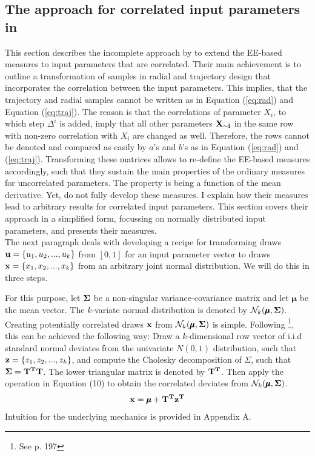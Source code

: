 \documentclass[a4paper,12pt]{article}
\begin{document}
\subsection{The approach for correlated input parameters in \cite{ge2017extending}}

This section describes the incomplete approach by \cite{ge2017extending} to extend the EE-based measures to input parameters that are correlated. Their main achievement is to outline a transformation of samples in radial and trajectory design that incorporates the correlation between the input parameters. This implies, that the trajectory and radial samples cannot be written as in Equation (\ref{eq:rad}) and Equation (\ref{eq:traj}). The reason is that the correlations of parameter $X_i$, to which step $\Delta^i$ is added, imply that all other parameters $\bold{X_{\sim i}}$ in the same row with non-zero correlation with $X_i$ are changed as well. Therefore, the rows cannot be denoted and compared as easily by $a$'s and $b$'s as in Equation (\ref{eq:rad}) and (\ref{eq:traj}). Transforming these matrices allows to re-define the EE-based measures accordingly, such that they sustain the main properties of the ordinary measures for uncorrelated parameters. The property is being a function of the mean derivative. Yet, \cite{ge2017extending} do not fully develop these measures. I explain how their measures lead to arbitrary results for correlated input parameters. This section covers their approach in a simplified form, focussing on normally distributed input parameters, and presents their measures.\\

\noindent
The next paragraph deals with developing a recipe for transforming draws $\bold{u} = \{u_1, u_2, ..., u_k\}$ from $[0,1]$ for an input parameter vector to draws $\bold{x} = \{x_1, x_2, ..., x_k\}$ from an arbitrary joint normal distribution. We will do this in three steps. 

For this purpose, let $\bold{\Sigma}$ be a non-singular variance-covariance matrix and let $\pmb{\mu}$ be the mean vector. The $k$-variate normal distribution is denoted by $\mathcal{N}_k(\pmb{\mu}, \bold{\Sigma})$. \\

\noindent
Creating potentially correlated draws $\bold{x}$ from $\mathcal{N}_k(\pmb{\mu}, \bold{\Sigma})$ is simple. Following \cite{gentle2006random}\footnote{See p. 197}, this can be achieved the following way: Draw a $k$-dimensional row vector of i.i.d standard normal deviates from the univariate $N(0,1)$ distribution, such that  $\bold{z} = \{z_1, z_2, ..., z_k\}$, and compute the Cholesky decomposition of $\Sigma$, such that $\bold{\Sigma} = \bold{T^T T}$. The lower triangular matrix is denoted by $\bold{T^T}$. Then apply the operation in Equation (10) to obtain the correlated deviates from $\mathcal{N}_k(\pmb{\mu}, \bold{\Sigma})$.
\begin{align}
\bold{x} = \pmb{\mu} + \bold{T^T z^T} 
\end{align}
Intuition for the underlying mechanics is provided in Appendix A. \\
\end{document}
